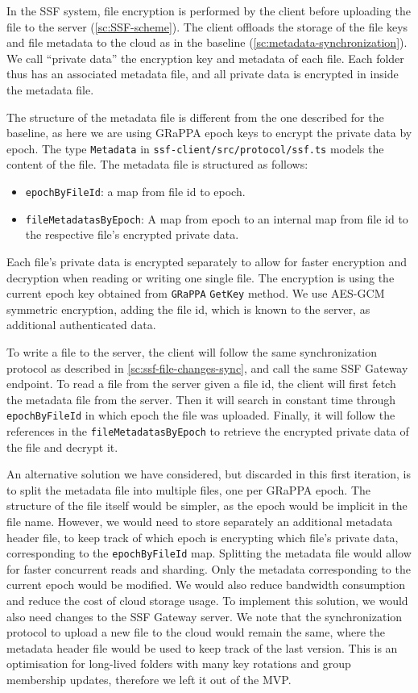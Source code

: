 In the SSF system, file encryption is performed by the client before
uploading the file to the server (\cref{sc:SSF-scheme}).
The client offloads the storage of the file keys and file metadata
to the cloud as in the baseline (\cref{sc:metadata-synchronization}).
We call ``private data'' the encryption key and metadata of each file.
Each folder thus has an associated metadata file, and all private data
is encrypted in inside the metadata file.

The structure of the metadata file is different from the one
described for the baseline, as here we are using GRaPPA epoch
keys to encrypt the private data by epoch.
The type \texttt{Metadata} in \texttt{ssf-client/src/protocol/ssf.ts}
models the content of the file. 
The metadata file is structured as follows:
\begin{itemize}
    \item \texttt{epochByFileId}: a map from file id to epoch.
    \item \texttt{fileMetadatasByEpoch}: A map from epoch to an internal map from file id to the respective file's encrypted private data.
\end{itemize}

Each file's private data is encrypted separately to allow for
faster encryption and decryption when reading or writing 
one single file.
The encryption is using the current epoch key obtained from
\texttt{GRaPPA} \texttt{GetKey} method. We use AES-GCM
symmetric encryption, adding the file id, which is known to
the server, as additional authenticated data.

To write a file to the server, the client will follow the same
synchronization protocol as described in \cref{sc:ssf-file-changes-sync}, 
and call the same SSF Gateway endpoint.
To read a file from the server given a file id, the client will
first fetch the metadata file from the server.
Then it will search in constant time through \texttt{epochByFileId} 
in which epoch the file was uploaded.
Finally, it will follow the references in the \texttt{fileMetadatasByEpoch}
to retrieve the encrypted private data of the file and decrypt it.

An alternative solution we have considered, but discarded in this
first iteration, is to split the metadata file into multiple files,
one per GRaPPA epoch.
The structure of the file itself would be simpler,
as the epoch would be implicit in the file name.
However, we would need to store separately an additional metadata header
file, to keep track of which epoch is encrypting which file's private data,
corresponding to the \texttt{epochByFileId} map.
Splitting the metadata file would allow for faster concurrent
reads and sharding. Only the metadata corresponding
to the current epoch would be modified.
We would also reduce bandwidth consumption and reduce the cost of cloud storage usage.
To implement this solution, we would also need changes to the
SSF Gateway server. We note that the synchronization protocol to
upload a new file to the cloud would remain the same,
where the metadata header file would be used to keep track
of the last version.
This is an optimisation for long-lived folders with many 
key rotations and group membership updates,
therefore we left it out of the MVP.

